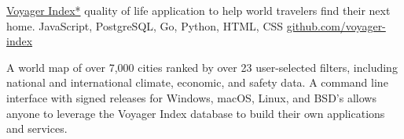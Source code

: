 \showoff
{\textcolor{my-blue}{\href{https://voyager-index.herokuapp.com}{Voyager Index*}}}
{quality of life application to help world travelers find their next home.}
{JavaScript, PostgreSQL, Go, Python, HTML, CSS}
{\textcolor{my-blue}{\href{https://github.com/voyager-index/}{github.com/voyager-index}}}

A world map of over 7,000 cities ranked by over 23 user-selected filters, including national and international climate,
economic, and safety data. A command line interface with signed releases for Windows, macOS, Linux, and BSD’s allows anyone to leverage the Voyager Index database to build their own applications and services.

\myBreak
